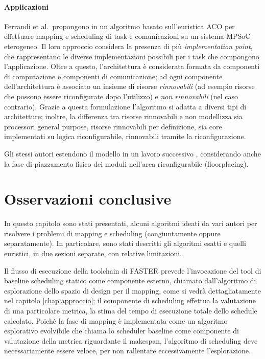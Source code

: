 \paragraph{Applicazioni}
Ferrandi et al.~propongono in \cite{AntColonyOptimization} un algoritmo basato 
sull'euristica \ac{ACO} per effettuare mapping e scheduling di task e 
comunicazioni su un sistema \ac{MPSoC} eterogeneo. Il loro approccio considera 
la presenza di più \emph{implementation point}, che rappresentano le diverse 
implementazioni possibili per i task che compongono l'applicazione. Oltre a 
questo, l'architettura è considerata formata da componenti di computazione e 
componenti di comunicazione; ad ogni componente dell'architettura è associato 
un insieme di risorse \emph{rinnovabili} (ad esempio risorse che possono essere 
riconfigurate dopo l'utilizzo) e \emph{non rinnovabili} (nel caso contrario).
Grazie a questa formulazione l'algoritmo si adatta a diversi tipi di 
architetture; inoltre, la differenza tra risorse rinnovabili e non modellizza 
sia processori general purpose, risorse rinnovabili per definizione, sia core 
implementati su logica riconfigurabile, rinnovabili tramite la riconfigurazione.

Gli stessi autori estendono il modello in un lavoro successivo
\cite{AntColonyOptimizationPlacing}, considerando anche la fase di piazzamento
fisico dei moduli nell'area riconfigurabile (floorplacing).

\section{Osservazioni conclusive}
\label{sec:osservazioniConclusiveSoA}
In questo capitolo sono stati presentati, alcuni algoritmi ideati da vari autori per risolvere
i problemi di mapping e scheduling (congiuntamente oppure separatamente).
In particolare, sono stati descritti gli algoritmi
esatti e quelli euristici, in due sezioni separate, con relative limitazioni.

Il flusso di esecuzione della toolchain di \ac{FASTER} prevede l'invocazione del tool di baseline
scheduling statico come componente esterno, chiamato dall'algoritmo di esplorazione dello spazio
di design per il mapping, come si vedr\`a dettagliatamente nel capitolo \ref{chap:approccio};
il componente di scheduling effettua la valutazione di una particolare
metrica, la stima del tempo di esecuzione totale dello schedule calcolato. Poichè la fase
di mapping è implementata come un algoritmo esplorativo evolvibile che chiama lo scheduler
baseline come componente di valutazione della metrica riguardante il makespan, l'algoritmo di
scheduling deve necessariamente essere veloce, per non rallentare eccessivamente l'esplorazione.

